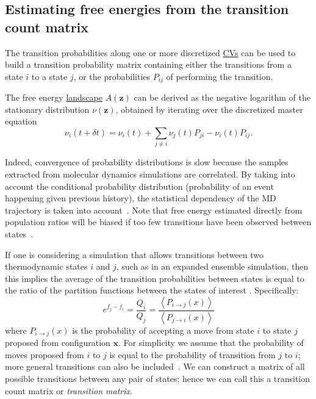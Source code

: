 \documentclass[9pt,review]{livecoms}
\newcommand{\vx}{\mathbf{x}}
\newcommand{\vz}{\mathbf{z}}
\begin{document}
\subsection{Estimating free energies from the transition count matrix\label{sec:transtion_matrix}}

The transition probabilities along one or more discretized \hyperlink{ref:CV} {CVs} can be used to build a transition probability matrix containing either the transitions from a state $i$ to a state $j$, or the probabilities $P_{ij}$ of performing the transition.

The free energy \hyperlink{ref:FES} {landscape} $A(\vz)$ can be derived as the negative logarithm of the stationary distribution $\nu(\vz)$, obtained by iterating over the discretized master equation
\begin{equation}
   \nu_i(t + \delta t) = \nu_i(t) + \sum_{j \neq i} \nu_j(t) P_{ji} - \nu_i(t) P_{ij}.
\end{equation}

Indeed, convergence of probability distributions is slow because the samples extracted from molecular dynamics simulations are correlated. By taking into account the conditional probability distribution (probability of an event happening given previous history), the statistical dependency of the MD trajectory is taken into account~\cite{No2007,Zhu2011,Rosta2014}. Note that free energy estimated directly from population ratios will be biased if too few transitions have been observed between states~\cite{No2009}.

If one is considering a simulation that allows transitions between two thermodynamic states $i$ and $j$, such as in an expanded ensemble simulation, then this implies the average of the transition probabilities between states is equal to the ratio of the partition functions between the states of interest \cite{deOliveira:EPJB:1998,Wang:JoSP:2002,escobedo_transition_2006}. Specifically:
\begin{equation}
e^{f_j-f_i} = \frac{Q_i}{Q_j} = \frac{\left \langle  P_{i\rightarrow j}(x)\right\rangle}{\left \langle P_{j\rightarrow i}(x) \right \rangle}
\end{equation}
where $P_{i\rightarrow j}(x)$ is the probability of accepting a move from state $i$ to state $j$ proposed from configuration $\vx$. For simplicity we assume that the probability of moves proposed from $i$ to $j$ is equal to the probability of transition from $j$ to $i$; more general transitions can also be included~\cite{escobedo_transition_2006}. We can construct a matrix of all possible transitions between any pair of states; hence we can call this a transition count matrix or \textit{transition matrix}.
\end{document}
